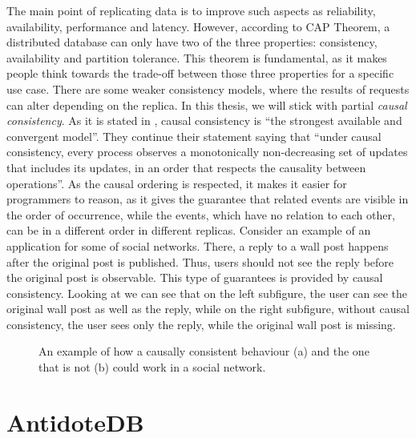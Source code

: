 The main point of replicating data is to improve such aspects as reliability, availability, performance and latency. However, according to CAP Theorem\cite{29}, a distributed database can only have two of the three properties: consistency, availability and partition tolerance. This theorem is fundamental, as it makes people think towards the trade-off between those three properties for a specific use case. There are some weaker consistency models, where the results of requests can alter depending on the replica\cite{28}.  In this thesis, we will stick with partial \textit{causal consistency}. As it is stated in \citet{7}, causal consistency is ``the strongest available and convergent model''. They continue their statement saying that ``under causal consistency, every process observes a monotonically non-decreasing set of updates that includes its updates, in an order that respects the causality between operations''. As the causal ordering is respected, it makes it easier for programmers to reason, as it gives the guarantee that related events are visible in the order of occurrence, while the events, which have no relation to each other, can be in a different order in different replicas. Consider an example of an application for some of social networks. There, a reply to a wall post happens after the original post is published. Thus, users should not see the reply before the original post is observable. This type of guarantees is provided by causal consistency. Looking at  we can see that on the left subfigure, the user can see the original wall post as well as the reply, while on the right subfigure, without causal consistency, the user sees only the reply, while the original wall post is missing. 

\begin{figure}%
    \centering
    \def\svgwidth{0.4\linewidth}
    \subfloat[]{{}}%
    \qquad
    \def\svgwidth{0.4\linewidth}
    \subfloat[]{{}}%
    \caption{An example of how a causally consistent behaviour (a) and the one that is not (b) could work in a social network.}%
    \label{fig:theory3}%
\end{figure}





\section{AntidoteDB}
\label{2-antidotedb}

